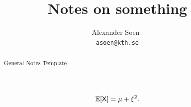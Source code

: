\documentclass[a4paper]{article}
\title{Notes on something}
\author{%
  Alexander Soen~\orcidlink{0000-0002-2440-4814}\\
  \texttt{asoen@kth.se}
}
\begin{document}
\maketitle

\begin{abstract}
  General Notes Template
\end{abstract}

\begin{equation}
  \mathbb{E}[\mathsf{X}] = \mu + \xi^2.
\end{equation}

\newpage


\end{document}
